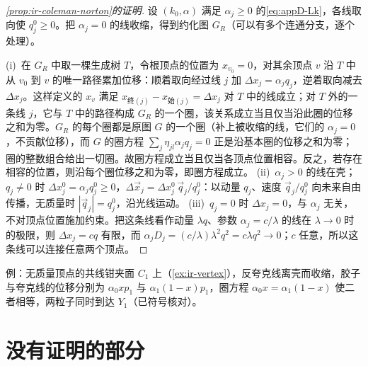 \begin{proof}[\cref{prop:ir-coleman-norton}的证明]
设 $(k_0,\alpha)$ 满足 $\alpha_j\ge0$ 的\cref{eq:appD-Lk}，各线取向使 $q_j^0\ge0$。把 $\alpha_j=0$ 的线收缩，得到约化图 $G_R$（可以有多个连通分支，逐个处理）。

(i)~在 $G_R$ 中取一棵生成树 $T$，令根顶点的位置为 $x_{v_0}=0$，对其余顶点 $v$ 沿 $T$ 中从 $v_0$ 到 $v$ 的唯一路径累加位移：顺着取向经过线 $j$ 加 $\Delta x_j=\alpha_jq_j$，逆着取向减去 $\Delta x_j$。这样定义的 $x_v$ 满足 $x_{\text{终}(j)}-x_{\text{始}(j)}=\Delta x_j$ 对 $T$ 中的线成立；对 $T$ 外的一条线 $j$，它与 $T$ 中的路径构成 $G_R$ 的一个圈，该关系成立当且仅当沿此圈的位移之和为零。$G_R$ 的每个圈都是原图 $G$ 的一个圈（补上被收缩的线，它们的 $\alpha_j=0$，不贡献位移），而 $G$ 的圈方程 $\sum_j\eta_{jl}\alpha_jq_j=0$ 正是沿基本圈的位移之和为零；圈的整数组合给出一切圈。故圈方程成立当且仅当各顶点位置相容。反之，若存在相容的位置，则沿每个圈位移之和为零，即圈方程成立。
(ii)~$\alpha_j>0$ 的线在壳；$q_j\ne0$ 时 $\Delta x_j^0=\alpha_jq_j^0\ge0$，$\Delta\vec x_j=\Delta x_j^0\,\vec q_j/q_j^0$：以动量 $q_j$、速度 $\vec q_j/q_j^0$ 向未来自由传播，无质量时 $|\vec q_j|=q_j^0$，沿光线运动。
(iii)~$q_j=0$ 时 $\Delta x_j=0$，与 $\alpha_j$ 无关，不对顶点位置施加约束。把这条线看作动量 $\lambda q$、参数 $\alpha_j=c/\lambda$ 的线在 $\lambda\to0$ 时的极限，则 $\Delta x_j=cq$ 有限，而 $\alpha_jD_j=(c/\lambda)\lambda^2q^2=c\lambda q^2\to0$；$c$ 任意，所以这条线可以连接任意两个顶点。
\end{proof}

例：无质量顶点的共线钳夹面 $C_1$ 上（\cref{ex:ir-vertex}），反夸克线离壳而收缩，胶子与夸克线的位移分别为 $\alpha_0xp_1$ 与 $\alpha_1(1-x)p_1$，圈方程 $\alpha_0x=\alpha_1(1-x)$ 使二者相等，两粒子同时到达 $Y_1$（已符号核对）。

\section{没有证明的部分}\label{sec:appD-caveats}

